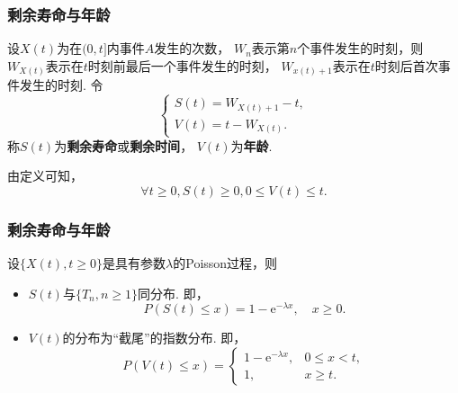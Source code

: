 \begin{frame}
    \frametitle{剩余寿命与年龄}
    \begin{mydefinition}[剩余寿命与年龄]
        设$X(t)$为在$(0,t]$内事件$A$发生的次数，
        $W_n$表示第$n$个事件发生的时刻，则
        $W_{X(t)}$表示在$t$时刻前最后一个事件发生的时刻，
        $W_{x(t)+1}$表示在$t$时刻后首次事件发生的时刻.
        令
        \begin{equation*}
            \begin{cases}
                S(t)=W_{X(t)+1}-t,\\
                V(t)=t-W_{X(t)}.
            \end{cases}
        \end{equation*}
        称$S(t)$为\textbf{剩余寿命}或\textbf{剩余时间}，
        $V(t)$为\textbf{年龄}. 
    \end{mydefinition}
    由定义可知，
    \begin{equation*}
        \forall t\geqslant 0,S(t)\geqslant 0,
        0\leqslant V(t)\leqslant t.
    \end{equation*}
\end{frame}

\begin{frame}
    \frametitle{剩余寿命与年龄}
    \begin{mytheorem}[剩余寿命与年龄的分布]
        设$\{X(t),t\geqslant 0\}$是具有参数$\lambda$的Poisson过程，则
        \begin{itemize}
            \item $S(t)$与$\{T_n,n\geqslant 1\}$同分布. 即，
            \begin{equation}
                P(S(t)\leqslant x)=1-\mathrm e^{-\lambda x},\quad x\geqslant 0.
            \end{equation}
            \item $V(t)$的分布为“截尾”的指数分布. 即，
            \begin{equation}
                P(V(t)\leqslant x)=
                \begin{cases}
                    1-\mathrm e^{-\lambda x},&0\leqslant x<t,\\
                    1,&x\geqslant t.
                \end{cases}
            \end{equation}
        \end{itemize}
    \end{mytheorem}
\end{frame}

